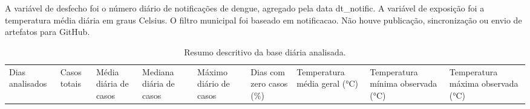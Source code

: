 \documentclass[
  12pt,
]{article}
\begin{document}
A variável de desfecho foi o número diário de notificações de dengue,
agregado pela data dt\_notific. A variável de exposição foi a
temperatura média diária em graus Celsius. O filtro municipal foi
baseado em notificacao. Não houve publicação, sincronização ou envio de
artefatos para GitHub.

\begin{longtable}[]{@{}
  >{\raggedright\arraybackslash}p{}
  >{\raggedright\arraybackslash}p{}
  >{\raggedright\arraybackslash}p{}
  >{\raggedright\arraybackslash}p{}
  >{\raggedright\arraybackslash}p{}
  >{\raggedright\arraybackslash}p{}
  >{\raggedright\arraybackslash}p{}
  >{\raggedright\arraybackslash}p{}
  >{\raggedright\arraybackslash}p{}@{}}
\caption{Resumo descritivo da base diária analisada.}\tabularnewline
\toprule\noalign{}
\begin{minipage}[b]{\linewidth}\raggedright
Dias analisados
\end{minipage} & \begin{minipage}[b]{\linewidth}\raggedright
Casos totais
\end{minipage} & \begin{minipage}[b]{\linewidth}\raggedright
Média diária de casos
\end{minipage} & \begin{minipage}[b]{\linewidth}\raggedright
Mediana diária de casos
\end{minipage} & \begin{minipage}[b]{\linewidth}\raggedright
Máximo diário de casos
\end{minipage} & \begin{minipage}[b]{\linewidth}\raggedright
Dias com zero casos (\%)
\end{minipage} & \begin{minipage}[b]{\linewidth}\raggedright
Temperatura média geral (°C)
\end{minipage} & \begin{minipage}[b]{\linewidth}\raggedright
Temperatura mínima observada (°C)
\end{minipage} & \begin{minipage}[b]{\linewidth}\raggedright
Temperatura máxima observada (°C)

\end{minipage}
\end{longtable}
\end{document}
